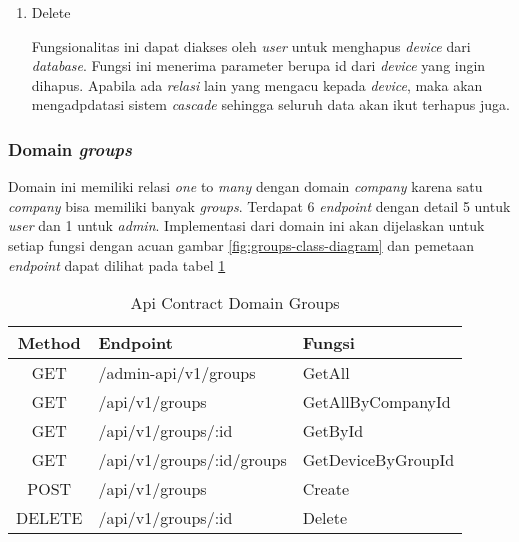 \begin{enumerate}
  \item Delete

        Fungsionalitas ini dapat diakses oleh \textit{user} untuk menghapus \textit{device} dari \textit{database}. Fungsi ini menerima parameter berupa id dari \textit{device} yang ingin dihapus. Apabila ada \textit{relasi} lain yang mengacu kepada \textit{device}, maka akan mengadpdatasi sistem \textit{cascade} sehingga seluruh data akan ikut terhapus juga.

\end{enumerate}

\subsubsection{Domain \textit{groups}}

Domain ini memiliki relasi \textit{one} to \textit{many} dengan domain \textit{company} karena satu \textit{company} bisa memiliki banyak \textit{groups}. Terdapat 6 \textit{endpoint} dengan detail 5 untuk \textit{user} dan 1 untuk \textit{admin}. Implementasi dari domain ini akan dijelaskan untuk setiap fungsi dengan acuan gambar \ref{fig:groups-class-diagram} dan pemetaan \textit{endpoint} dapat dilihat pada tabel \ref{tab:api-contract-domain-groups}

\bgroup
\begin{table}[ht]
  \caption{Api Contract Domain Groups}
  \label{tab:api-contract-domain-groups}
  \def\arraystretch{1.7}
  \centering
  \begin{tabular}{|c|p{6cm}|p{4cm}|}
    \hline
    Method & Endpoint                  &
    Fungsi                                                  \\
    \hline
    GET    & /admin-api/v1/groups      & GetAll             \\
    \hline
    GET    & /api/v1/groups            & GetAllByCompanyId  \\
    \hline
    GET    & /api/v1/groups/:id        & GetById            \\
    \hline
    GET    & /api/v1/groups/:id/groups & GetDeviceByGroupId \\
    \hline
    POST   & /api/v1/groups            & Create             \\
    \hline
    DELETE & /api/v1/groups/:id        & Delete             \\
    \hline
  \end{tabular}
\end{table}
\egroup


